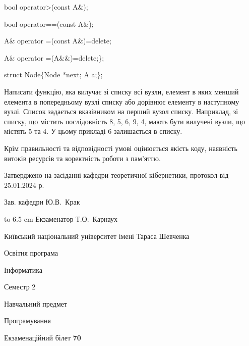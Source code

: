 \documentclass[12pt, ukrainian]{article}
\begin{document}
{\quad  bool operator>(const A\&); 

\quad  bool operator==(const A\&); 

\quad A\& operator =(const A\&)=delete; 

\quad  A\& operator =(A\&\&)=delete;\};

struct Node\{Node *next; A a;\};

 Написати функцію, яка вилучає зі списку всі вузли, елемент в яких менший елемента в попередньому вузлі списку або дорівнює елементу в наступному вузлі. Список задається вказівником на перший вузол списку. Наприклад, зі списку, що містить послідовність 8, 5, 6, 9, 4, мають бути вилучені вузли, що містять 5 та 4. У цьому прикладі 6 залишається в списку.

Крім правильності та відповідності умові оцінюється якість коду, наявність витоків ресурсів та коректність роботи з пам'яттю. 

}
{\smallskip\smallskip \begin {scriptsize} Затверджено на засіданні кафедри теоретичної кібернетики, протокол   від   25.01.2024 р.\par\smallskip\smallskip\smallskip\smallskip
{\parbox {6.5 cm} {Зав. кафедри \dotfill Ю.В.~Крак}}\hspace {0.7cm} {\hbox to 6.5 cm { Екзаменатор \dotfill Т.О.~Карнаух}} \end{scriptsize}}
\newpage
{{\begin {scriptsize}\par
{ \center  Київський національний університет імені Тараса Шевченка \par}
{\parbox {5 cm}{Освітня програма \hfill}{\parbox {7 cm}{Інформатика\hfill}}\parbox {6 cm}{\hfill Семестр 2}}\par
{\parbox {5 cm} {Навчальний предмет \hfill}\parbox {7 cm}{Програмування \hfill}\parbox {6cm}{\hfill}\par}\vspace{-15pt} \end{scriptsize}}{\center Екзаменаційний білет \No \textbf { 70 }\par}}
\end{document}
